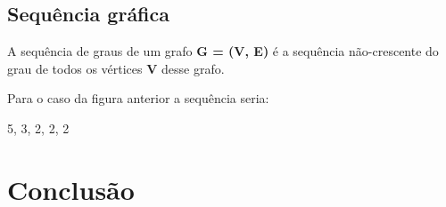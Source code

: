 \documentclass[a4paper, 12pt]{article}
\begin{document}
\subsection{Sequência gráfica}

    A sequência de graus de um grafo \textbf{G = (V, E)} é a sequência não-crescente do grau de todos os vértices \textbf{V} desse grafo. 
    
    \indent Para o caso da figura anterior a sequência seria:
    
    \begin{center}
     5, 3, 2, 2, 2
    \end{center}


\section{Conclusão}
\end{document}
